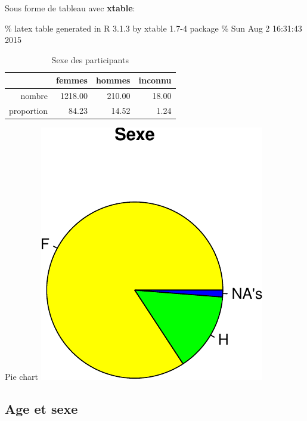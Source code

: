 \documentclass[]{article}
\begin{document}
Sous forme de tableau avec \textbf{xtable}:

\% latex table generated in R 3.1.3 by xtable 1.7-4 package \% Sun Aug 2
16:31:43 2015

\begin{table}[ht]
\centering
\begin{tabular}{rrrr}
  \hline
 & femmes & hommes & inconnu \\ 
  \hline
nombre & 1218.00 & 210.00 & 18.00 \\ 
  proportion & 84.23 & 14.52 & 1.24 \\ 
   \hline
\end{tabular}
\caption{Sexe des participants} 
\label{sexe}
\end{table}

Pie chart
\includegraphics{qs_etudiants_files/figure-latex/pie_sexe-1.pdf}

\subsection{Age et sexe}\label{age-et-sexe}
\end{document}
